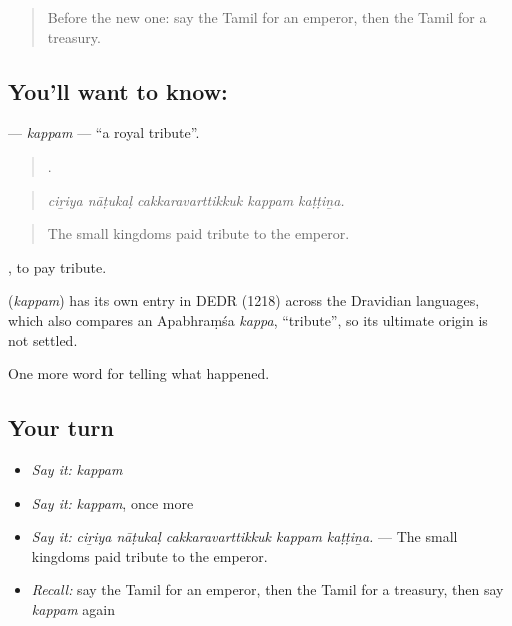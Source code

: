 \label{lesson:TA-C330-kappam}



\begin{quote}
Before the new one: say the Tamil for an emperor, then the Tamil for a treasury.
\end{quote}

\subsection*{You'll want to know: }
\textbf{} — \emph{kappam} — \textquotedblleft{}a royal tribute\textquotedblright{}.

\begin{quote}
    .
\end{quote}

\begin{quote}
\emph{ciṟiya nāṭukaḷ cakkaravarttikkuk kappam kaṭṭiṉa.}
\end{quote}

\begin{quote}
The small kingdoms paid tribute to the emperor.
\end{quote}

 , to pay tribute.

\begin{cousinweb}
\textbf{} (\emph{kappam}) has its own entry in DEDR (1218) across the Dravidian languages, which also compares an Apabhraṃśa \emph{kappa}, \textquotedblleft{}tribute\textquotedblright{}, so its ultimate origin is not settled.
\end{cousinweb}

\begin{grammarlens}[title={What you've built}]
One more word for telling what happened.
\end{grammarlens}

\subsection*{Your turn}
\begin{itemize}
\raggedright
  \item \emph{Say it:} \emph{kappam}
  \item \emph{Say it:} \emph{kappam}, once more
  \item \emph{Say it:} \emph{ciṟiya nāṭukaḷ cakkaravarttikkuk kappam kaṭṭiṉa.} — The small kingdoms paid tribute to the emperor.
  \item \emph{Recall:} say the Tamil for an emperor, then the Tamil for a treasury, then say \emph{kappam} again
\end{itemize}

